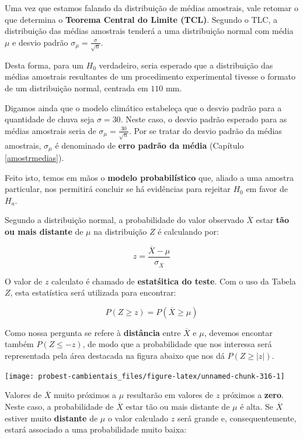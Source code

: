 \documentclass[
]{book}
\begin{document}
Uma vez que estamos falando da distribuição de médias amostrais, vale retomar o que determina o \textbf{Teorema Central do Limite (TCL)}. Segundo o TLC, a distribuição das médias amostrais tenderá a uma distribuição normal com média \(\mu\) e desvio padrão \(\sigma_{\mu} = \frac{\sigma}{\sqrt{n}}\).

Desta forma, para um \(H_0\) verdadeiro, seria esperado que a distribuição das médias amostrais resultantes de um procedimento experimental tivesse o formato de um distribuição normal, centrada em \(110\) mm.

Digamos ainda que o modelo climático estabeleça que o desvio padrão para a quantidade de chuva seja \(\sigma = 30\). Neste caso, o desvio padrão esperado para as médias amostrais seria de \(\sigma_{\mu} = \frac{30}{\sqrt{n}}\). Por se tratar do desvio padrão da médias amostrais, \(\sigma_{\mu}\) é denominado de \textbf{erro padrão da média} (Capítulo \ref{amostrmedias}).

Feito isto, temos em mãos o \textbf{modelo probabilístico} que, aliado a uma amostra particular, nos permitirá concluir se há evidências para rejeitar \(H_0\) em favor de \(H_a\).

Segundo a distribuição normal, a probabilidade do valor observado \(\overline{X}\) estar \textbf{tão ou mais distante} de \(\mu\) na distribuição \(Z\) é calculando por:

\[z = \frac{\overline{X} - \mu}{\sigma_{\overline{X}}}\]

O valor de \(z\) calculato é chamado de \textbf{estatśitica do teste}. Com o uso da Tabela \(Z\), esta estatística será utilizada para encontrar:

\[P(Z \ge z) = P(\overline{X} \ge \mu)\]

Como nossa pergunta se refere à \textbf{distância} entre \(\overline{X}\) e \(\mu\), devemos encontar também \(P(Z \le -z)\), de modo que a probabilidade que nos interessa será representada pela área destacada na figura abaixo que nos dá \(P(Z \ge |z|)\).

\begin{center}\texttt{[image: probest-cambientais\_files/figure-latex/unnamed-chunk-316-1]} \end{center}

Valores de \(\overline{X}\) muito próximos a \(\mu\) resultarão em valores de \(z\) próximos a \textbf{zero}. Neste caso, a probabilidade de \(\overline{X}\) estar tão ou mais distante de \(\mu\) é alta. Se \(\overline{X}\) estiver muito \textbf{distante} de \(\mu\) o valor calculado \(z\) será grande e, consequentemente, estará associado a uma probabilidade muito baixa:
\end{document}
